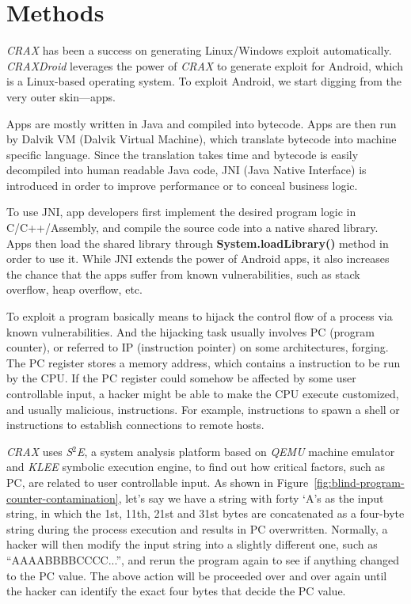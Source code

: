 \chapter{Methods}

\emph{CRAX}\autocite{huang2012crax} has been a success on generating
Linux/Windows exploit automatically. \emph{CRAXDroid} leverages the power of
\emph{CRAX} to generate exploit for Android, which is a Linux-based operating
system. To exploit Android, we start digging from the very outer skin---apps.

Apps are mostly written in Java and compiled into bytecode. Apps are then run
by Dalvik VM (Dalvik Virtual Machine), which translate bytecode into machine
specific language. Since the translation takes time and bytecode is easily
decompiled into human readable Java code, JNI (Java Native Interface) is
introduced in order to improve performance or to conceal business logic.

To use JNI, app developers first implement the desired program logic in
C/C++/Assembly, and compile the source code into a native shared library. Apps
then load the shared library through \textbf{System.loadLibrary()} method in
order to use it. While JNI extends the power of Android apps, it also increases
the chance that the apps suffer from known vulnerabilities, such as stack
overflow, heap overflow, etc.

To exploit a program basically means to hijack the control flow of a process
via known vulnerabilities. And the hijacking task usually involves PC (program
counter), or referred to IP (instruction pointer) on some architectures,
forging. The PC register stores a memory address, which contains a instruction
to be run by the CPU. If the PC register could somehow be affected by some user
controllable input, a hacker might be able to make the CPU execute customized,
and usually malicious, instructions. For example, instructions to spawn a
shell or instructions to establish connections to remote hosts.

\emph{CRAX} uses \emph{S$^{2}$E}\autocite{chipounov2011s2e}, a system analysis
platform based on \emph{QEMU} machine emulator and \emph{KLEE} symbolic
execution engine, to find out how critical factors, such as PC, are related to
user controllable input. As shown in
Figure~\ref{fig:blind-program-counter-contamination}, let's say we have a
string with forty `A's as the input string, in which the 1st, 11th, 21st and
31st bytes are concatenated as a four-byte string during the process execution
and results in PC overwritten. Normally, a hacker will then modify the input
string into a slightly different one, such as ``AAAABBBBCCCC...'', and rerun
the program again to see if anything changed to the PC value. The above action
will be proceeded over and over again until the hacker can identify the exact
four bytes that decide the PC value.

